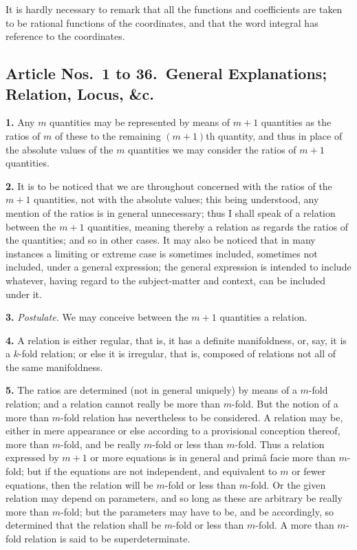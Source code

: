 \documentclass[11pt,a4paper]{article}
\theoremstyle{definition}
\begin{document}
It is hardly necessary to remark that all the functions and coefficients are taken to be rational functions of the coordinates, and that the word integral has reference to the coordinates.

\setcounter{page}{456}

\subsection*{Article Nos.\ 1 to 36.\ General Explanations; Relation, Locus, \&c.}

\noindent\textbf{1.} Any $m$ quantities may be represented by means of $m+1$ quantities as the ratios of $m$ of these to the remaining $(m+1)$th quantity, and thus in place of the absolute values of the $m$ quantities we may consider the ratios of $m+1$ quantities.

\noindent\textbf{2.} It is to be noticed that we are throughout concerned with the ratios of the $m+1$ quantities, not with the absolute values; this being understood, any mention of the ratios is in general unnecessary; thus I shall speak of a relation between the $m+1$ quantities, meaning thereby a relation as regards the ratios of the quantities; and so in other cases. It may also be noticed that in many instances a limiting or extreme case is sometimes included, sometimes not included, under a general expression; the general expression is intended to include whatever, having regard to the subject-matter and context, can be included under it.

\noindent\textbf{3.} \textit{Postulate.} We may conceive between the $m+1$ quantities a relation.

\noindent\textbf{4.} A relation is either regular, that is, it has a definite manifoldness, or, say, it is a $k$-fold relation; or else it is irregular, that is, composed of relations not all of the same manifoldness.

\noindent\textbf{5.} The ratios are determined (not in general uniquely) by means of a $m$-fold relation; and a relation cannot really be more than $m$-fold. But the notion of a more than $m$-fold relation has nevertheless to be considered. A relation may be, either in mere appearance or else according to a provisional conception thereof, more than $m$-fold, and be really $m$-fold or less than $m$-fold. Thus a relation expressed by $m+1$ or more equations is in general and prim\^{a} facie more than $m$-fold; but if the equations are not independent, and equivalent to $m$ or fewer equations, then the relation will be $m$-fold or less than $m$-fold. Or the given relation may depend on parameters, and so long as these are arbitrary be really more than $m$-fold; but the parameters may have to be, and be accordingly, so determined that the relation shall be $m$-fold or less than $m$-fold. A more than $m$-fold relation is said to be superdeterminate.
\end{document}
